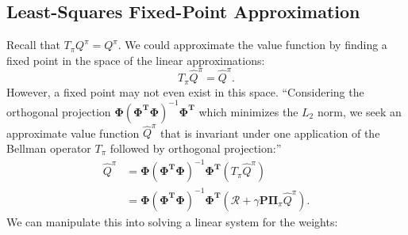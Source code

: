 \documentclass{article}
\begin{document}

\subsection*{Least-Squares Fixed-Point Approximation} %
\label{sub:least_squares_fixed_point_approximation}

Recall that $T_{\pi}Q^{\pi}=Q^{\pi}$. We could approximate the value function by finding a fixed point in the space of the linear approximations:
\[
	T_{\pi}\hat{Q}^{\pi}= \hat{Q}^{\pi}.
\]
However, a fixed point may not even exist in this space. 
``Considering the orthogonal projection $\mathbf{\Phi}(\mathbf{\Phi}^{\mathbf{T}}\mathbf{\Phi})^{-1}\mathbf{\Phi}^{\mathbf{T}}$ which minimizes the $L_{2}$ norm, we seek an approximate value function $\hat{Q}^{\pi}$ that is invariant under one application of the Bellman operator $T_{\pi}$ followed by orthogonal projection:''
\begin{align*}
	\hat{Q}^{\pi}&=\mathbf{\Phi}(\mathbf{\Phi}^{\mathbf{T}}\mathbf{\Phi})^{-1}\mathbf{\Phi}^{\mathbf{T}}(T_{\pi}\hat{Q}^{\pi})\\
	&= \mathbf{\Phi}(\mathbf{\Phi}^{\mathbf{T}}\mathbf{\Phi})^{-1}\mathbf{\Phi}^{\mathbf{T}}
		(\mathcal{R}+\gamma \mathbf{P}\mathbf{\Pi}_{\pi}\hat{Q}^{\pi}).
\end{align*} 
We can manipulate this into solving a linear system for the weights:
\end{document}
